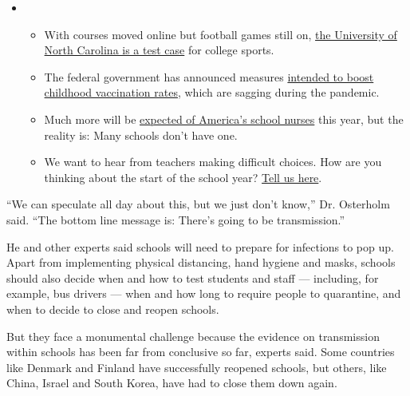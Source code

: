 \begin{itemize}
\item
  \begin{itemize}
  \tightlist
  \item
    With courses moved online but football games still on,
    \href{https://www.nytimes3xbfgragh.onion/2020/08/18/sports/ncaafootball/unc-football-acc-online-classes.html?action=click\&pgtype=Article\&state=default\&region=MAIN_CONTENT_3\&context=storylines_keepup}{the
    University of North Carolina is a test case} for college sports.
  \item
    The federal government has announced measures
    \href{https://www.nytimes3xbfgragh.onion/2020/08/20/health/coronavirus-flu-vaccine.html?action=click\&pgtype=Article\&state=default\&region=MAIN_CONTENT_3\&context=storylines_keepup}{intended
    to boost childhood vaccination rates}, which are sagging during the
    pandemic.
  \item
    Much more will be
    \href{https://www.nytimes3xbfgragh.onion/2020/08/20/us/schools-reopening-nurses-covid.html?action=click\&pgtype=Article\&state=default\&region=MAIN_CONTENT_3\&context=storylines_keepup}{expected
    of America's school nurses} this year, but the reality is: Many
    schools don't have one.
  \item
    We want to hear from teachers making difficult choices. How are you
    thinking about the start of the school year?
    \href{https://www.nytimes3xbfgragh.onion/2020/08/19/us/teachers-school-reopenings.html?action=click\&pgtype=Article\&state=default\&region=MAIN_CONTENT_3\&context=storylines_keepup}{Tell
    us here}.
  \end{itemize}
\end{itemize}

``We can speculate all day about this, but we just don't know,'' Dr.
Osterholm said. ``The bottom line message is: There's going to be
transmission.''

He and other experts said schools will need to prepare for infections to
pop up. Apart from implementing physical distancing, hand hygiene and
masks, schools should also decide when and how to test students and
staff --- including, for example, bus drivers --- when and how long to
require people to quarantine, and when to decide to close and reopen
schools.

But they face a monumental challenge because the evidence on
transmission within schools has been far from conclusive so far, experts
said. Some countries like Denmark and Finland have successfully reopened
schools, but others, like China, Israel and South Korea, have had to
close them down again.

